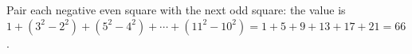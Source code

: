 Pair each negative even square with the next odd square: the value is $1+(3^2-2^2)+(5^2-4^2)+\cdots+(11^2-10^2)=1+5+9+13+17+21=\boxed{66}$.

